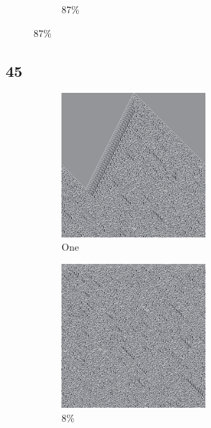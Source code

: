 \documentclass[12pt, fleqn]{report}                             %
\theoremstyle{break}                                            %
\begin{document}
\begin{figure}[ht!]
\begin{subfigure}[b]{0.4\linewidth}
          \caption{87\%}
        \end{subfigure}
      \end{figure}


      \clearpage
      \subsection{45}
      \begin{figure}[ht!]
        \centering
        \begin{subfigure}[b]{0.4\linewidth}
          \includegraphics[width=0.6\textwidth]{Images/45/a.png}
          \caption{One}
        \end{subfigure}
        \begin{subfigure}[b]{0.4\linewidth}
          \includegraphics[width=0.6\textwidth]{Images/45/b.png}
          \caption{8\%}
        \end{subfigure}
        \begin{subfigure}[b]{0.4\linewidth}

\end{subfigure}
\end{figure}
\end{document}
